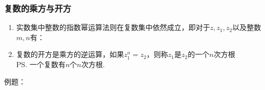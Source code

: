 \subsubsection*{复数的乘方与开方}
\begin{enumerate}
    \item 实数集中整数的指数幂运算法则在复数集中依然成立，即对于$z, z_1, z_2$以及整数$m, n$有：
    \item 复数的开方是乘方的逆运算，如果$z_1^n = z_2$，则称$z_1$是$z_2$的一个$n$次方根 \\
    \ps 一个复数有$n$个$n$次方根.
\end{enumerate}
例题：
